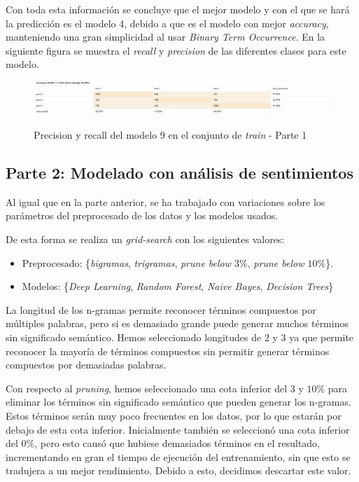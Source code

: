 \documentclass[es]{uc3mreport}
\begin{document}
\begin{report}
    Con toda esta información se concluye que el mejor modelo y con el que se hará
    la predicción es el modelo 4, debido a que es el modelo con mejor
    \textit{accuracy}, manteniendo una gran simplicidad al usar \textit{Binary Term
    Occurrence}. En la siguiente figura se muestra el \textit{recall} y
    \textit{precision} de las diferentes clases para este modelo.

    \begin{figure}[H]
        \center
        \includegraphics[width=\linewidth]{train1.jpeg}\\
        \caption{Precision y recall del modelo 9 en el conjunto de \textit{train} - Parte 1}
    \end{figure}

\subsection{Parte 2: Modelado con análisis de sentimientos}
\label{sec:parte2}

    Al igual que en la parte anterior, se ha trabajado con variaciones
    sobre los parámetros del preprocesado de los datos y los modelos usados.

    De esta forma se realiza un \textit{grid-search} con los siguientes valores:
    \begin{itemize}
        \item Preprocesado: \{\textit{bigramas}, \textit{trigramas}, \textit{prune below $3\%$}, \textit{prune below $10\%$}\}.
        \item Modelos: \{\textit{Deep Learning}, \textit{Random Forest}, \textit{Naive Bayes}, \textit{Decision Trees}\}
    \end{itemize}

    La longitud de los n-gramas permite reconocer términos compuestos por múltiples
    palabras, pero si es demasiado grande puede generar muchos términos sin significado
    semántico. Hemos seleccionado longitudes de $2$ y $3$ ya que permite reconocer
    la mayoría de términos compuestos sin permitir generar términos compuestos
    por demasiadas palabras.

    Con respecto al \textit{pruning}, hemos seleccionado una cota inferior del $3$ y $10$\%
    para eliminar los términos sin significado semántico que pueden generar los
    n-gramas. Estos términos serán muy poco frecuentes en los datos, por lo que
    estarán por debajo de esta cota inferior. Inicialmente también se seleccionó
    una cota inferior del $0\%$, pero esto causó que hubiese demasiados términos
    en el resultado, incrementando en gran el tiempo de ejecución del entrenamiento, sin que esto se tradujera a un mejor rendimiento.
    Debido a esto, decidimos descartar este valor.


\end{report}
\end{document}
